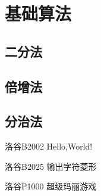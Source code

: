 \chapter{基础算法}
\section{二分法}
\section{倍增法}
\section{分治法}


\begin{problemset}
\item 洛谷B2002 Hello,World!
\item 洛谷B2025 输出字符菱形
\item 洛谷P1000 超级玛丽游戏
\end{problemset}


